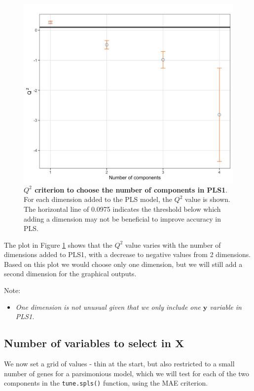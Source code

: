 \documentclass[]{book}
\providecommand{\tightlist}{%
  \setlength{\itemsep}{0pt}\setlength{\parskip}{0pt}}
\begin{document}
\begin{figure}

{\centering \includegraphics[width=0.5\linewidth]{Figures/PLS/pls1-Q2-1} 

}

\caption{\textbf{\(Q^2\) criterion to choose the number of
components in PLS1}. For each dimension added to the PLS model, the
\(Q^2\) value is shown. The horizontal line of 0.0975 indicates the
threshold below which adding a dimension may not be beneficial to
improve accuracy in PLS.}\label{fig:pls1-Q2}
\end{figure}







The plot in Figure \ref{fig:pls1-Q2} shows that the \(Q^2\) value varies
with the number of dimensions added to PLS1, with a decrease to negative
values from 2 dimensions. Based on this plot we would choose only one
dimension, but we will still add a second dimension for the graphical
outputs.

Note:

\begin{itemize}
\tightlist
\item
  \emph{One dimension is not unusual given that we only include one
  \(\boldsymbol y\) variable in PLS1.}
\end{itemize}

\subsection{\texorpdfstring{Number of variables to select in
\(\boldsymbol X\)}{Number of variables to select in \textbackslash{}boldsymbol X}}\label{number-of-variables-to-select-in-boldsymbol-x}

We now set a grid of values - thin at the start, but also restricted to
a small number of genes for a parsimonious model, which we will test for
each of the two components in the \texttt{tune.spls()} function, using
the MAE criterion.
\end{document}
